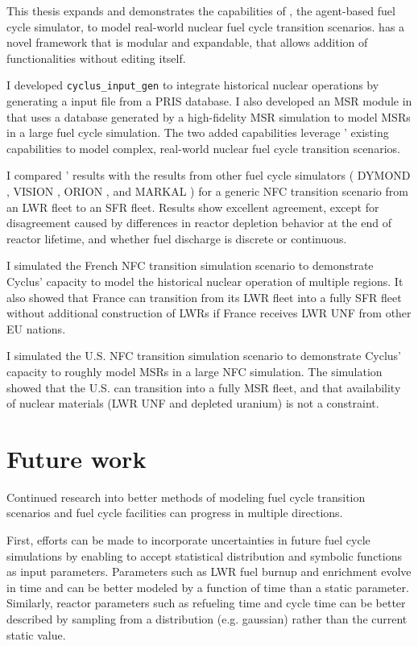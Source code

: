 This thesis expands and demonstrates the capabilities of \Cyclus, the agent-based
fuel cycle simulator, to model real-world nuclear fuel cycle
transition scenarios. \Cyclus has a novel framework that is
modular and expandable, that allows addition of functionalities
without editing \Cyclus itself.

I developed \texttt{cyclus_input_gen}
to integrate historical nuclear operations by generating
a \Cyclus input file from a \gls{PRIS} database. I also
developed an \gls{MSR} module in \Cyclus that uses a database
generated by a high-fidelity \gls{MSR} simulation to model
\glspl{MSR} in a large fuel cycle simulation. The two
added capabilities leverage \Cyclus' existing capabilities
to model complex, real-world nuclear fuel cycle transition
scenarios.

I compared \Cyclus' results with
the results from other fuel cycle simulators
(
DYMOND \cite{yacout_modeling_2005},
VISION \cite{jacobson_verifiable_2010},
ORION \cite{gregg_analysis_2012}, and
MARKAL \cite{shay_epa_2006}
) for a generic \gls{NFC} transition scenario from an
\gls{LWR} fleet to an \gls{SFR} fleet. Results show
excellent agreement, except for disagreement caused 
by differences in reactor depletion
behavior at the end of reactor lifetime, and
whether fuel discharge is discrete or continuous.


I simulated the French \gls{NFC} transition simulation scenario
to demonstrate
Cyclus' capacity to model the historical nuclear operation
of multiple regions. It also showed that
France can transition from its \gls{LWR} fleet into a fully \gls{SFR} fleet
without additional construction of \glspl{LWR} if France receives
\gls{LWR} \gls{UNF} from other \gls{EU} nations.

I simulated the U.S. \gls{NFC} transition simulation scenario
to demonstrate
Cyclus' capacity to roughly model \glspl{MSR} in
a large \gls{NFC} simulation. The simulation showed
that the U.S. can transition into a fully
\gls{MSR} fleet, and that availability of nuclear materials
(\gls{LWR} \gls{UNF} and depleted uranium) is not a constraint.



\section{Future work}
Continued research into better methods of modeling fuel cycle
transition scenarios and fuel cycle facilities can progress
in multiple directions. 

First, efforts can be made to incorporate
uncertainties in future fuel cycle simulations by enabling
\Cyclus to accept statistical distribution and symbolic
functions as input parameters. Parameters such as \gls{LWR} fuel
burnup and enrichment evolve in time and can be better modeled
by a function of time than a static parameter. Similarly, reactor parameters
such as refueling time and cycle time can be better described by sampling
from a distribution (e.g. gaussian) rather than the current static
value.

